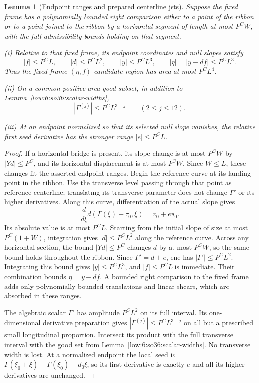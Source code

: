 \documentclass[11pt]{amsart}
\newtheorem{lemma}[theorem]{Lemma}
\theoremstyle{definition}
\theoremstyle{remark}
\numberwithin{equation}{section}
\begin{document}
\begin{lemma}[Endpoint ranges and prepared centerline jets]\label{low:6:so36:endpoints}
Suppose the fixed frame has a polynomially bounded right comparison either to a point of the ribbon or to a point joined to the ribbon by a horizontal segment of length at most $P^CW$, with the full admissibility bounds holding on that segment.

\noindent\textup{(i)} Relative to that fixed frame, its endpoint coordinates and null slopes satisfy
\[
|f|\le P^CL,\qquad |d|\le P^CL^2,\qquad |y|\le P^CL^3,\qquad |\eta|=|y-df|\le P^CL^3.
\]
Thus the fixed-frame $(\eta,f)$ candidate region has area at most $P^CL^4$.

\noindent\textup{(ii)} On a common positive-area good subset, in addition to Lemma~\ref{low:6:so36:scalar-widths},
\[
|\Gamma^{(j)}|\le P^CL^{3-j}\qquad(2\le j\le12).
\]

\noindent\textup{(iii)} At an endpoint normalized so that its selected null slope vanishes, the relative first seed derivative has the stronger range $|e|\le P^CL$.
\end{lemma}
\begin{proof}
If a horizontal bridge is present, its slope change is at most $P^CW$ by $|Yd|\le P^C$, and its horizontal displacement is at most $P^CW$. Since $W\le L$, these changes fit the asserted endpoint ranges. Begin the reference curve at its landing point in the ribbon. Use the transverse level passing through that point as reference centerline; translating its transverse parameter does not change $\Gamma'$ or its higher derivatives. Along this curve, differentiation of the actual slope gives
\[
\frac{d}{d\xi}d(\Gamma(\xi)+\tau_0,\xi)=v_0+e u_0.
\]
Its absolute value is at most $P^CL$. Starting from the initial slope of size at most $P^C(1+W)$, integration gives $|d|\le P^CL^2$ along the reference curve. Across any horizontal section, the bound $|Yd|\le P^C$ changes $d$ by at most $P^CW$, so the same bound holds throughout the ribbon. Since $\Gamma'=d+e$, one has $|\Gamma'|\le P^CL^2$. Integrating this bound gives $|y|\le P^CL^3$, and $|f|\le P^CL$ is immediate. Their combination bounds $\eta=y-df$. A bounded right comparison to the fixed frame adds only polynomially bounded translations and linear shears, which are absorbed in these ranges. 

The algebraic scalar $\Gamma'$ has amplitude $P^CL^2$ on its full interval. Its one-dimensional derivative preparation gives $|\Gamma^{(j)}|\le P^CL^{3-j}$ on all but a prescribed small longitudinal proportion. Intersect its product with the full transverse interval with the good set from Lemma~\ref{low:6:so36:scalar-widths}. No transverse width is lost. At a normalized endpoint the local seed is $\Gamma(\xi_0+\xi)-\Gamma(\xi_0)-d_0\xi$, so its first derivative is exactly $e$ and all its higher derivatives are unchanged.
\end{proof}
\end{document}
